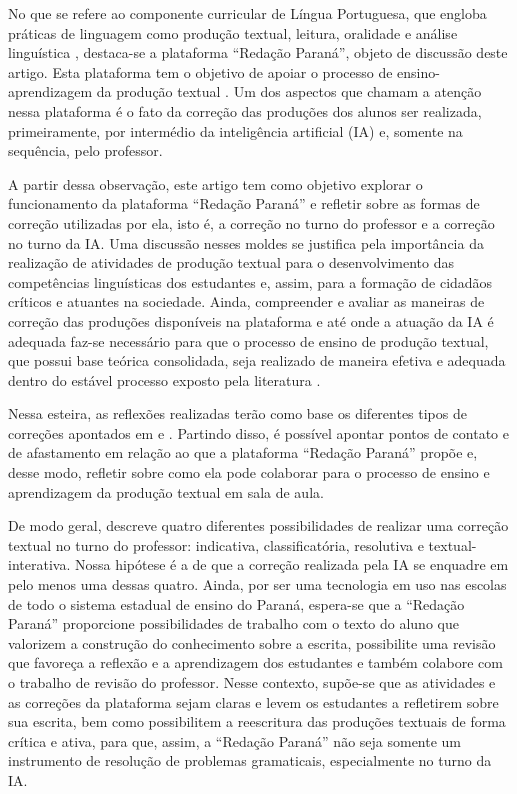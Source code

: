 \documentclass[portuguese]{textolivre}
\begin{document}
No que se refere ao componente curricular de Língua Portuguesa, que engloba práticas de linguagem como produção textual, leitura, oralidade e análise linguística \cite{parana2025a, parana2021b, parana2025b}, destaca-se a plataforma ``Redação Paraná'', objeto de discussão deste artigo. Esta plataforma tem o objetivo de apoiar o processo de ensino-aprendizagem da produção textual \cite{parana2023}. Um dos aspectos que chamam a atenção nessa plataforma é o fato da correção das produções dos alunos ser realizada, primeiramente, por intermédio da inteligência artificial (IA) e, somente na sequência, pelo professor.

A partir dessa observação, este artigo tem como objetivo explorar o funcionamento da plataforma ``Redação Paraná'' e refletir sobre as formas de correção utilizadas por ela, isto é, a correção no turno do professor e a correção no turno da IA. Uma discussão nesses moldes se justifica pela importância da realização de atividades de produção textual para o desenvolvimento das competências linguísticas dos estudantes e, assim, para a formação de cidadãos críticos e atuantes na sociedade. Ainda, compreender e avaliar as maneiras de correção das produções disponíveis na plataforma e até onde a atuação da IA é adequada faz-se necessário para que o processo de ensino de produção textual, que possui base teórica consolidada, seja realizado de maneira efetiva e adequada dentro do estável processo exposto pela literatura \cite{ruiz2015, conceicao2004}.

Nessa esteira, as reflexões realizadas terão como base os diferentes tipos de correções apontados em \textcite{ruiz2015} e \textcite{conceicao2004}. Partindo disso, é possível apontar pontos de contato e de afastamento em relação ao que a plataforma ``Redação Paraná'' propõe e, desse modo, refletir sobre como ela pode colaborar para o processo de ensino e aprendizagem da produção textual em sala de aula.

De modo geral, \textcite{ruiz2015} descreve quatro diferentes possibilidades de realizar uma correção textual no turno do professor: indicativa, classificatória, resolutiva e textual-interativa. Nossa hipótese é a de que a correção realizada pela IA se enquadre em pelo menos uma dessas quatro. Ainda, por ser uma tecnologia em uso nas escolas de todo o sistema estadual de ensino do Paraná, espera-se que a ``Redação Paraná'' proporcione possibilidades de trabalho com o texto do aluno que valorizem a construção do conhecimento sobre a escrita, possibilite uma revisão que favoreça a reflexão e a aprendizagem dos estudantes e também colabore com o trabalho de revisão do professor. Nesse contexto, supõe-se que as atividades e as correções da plataforma sejam claras e levem os estudantes a refletirem sobre sua escrita, bem como possibilitem a reescritura das produções textuais de forma crítica e ativa, para que, assim, a ``Redação Paraná'' não seja somente um instrumento de resolução de problemas gramaticais, especialmente no turno da IA.
\end{document}
